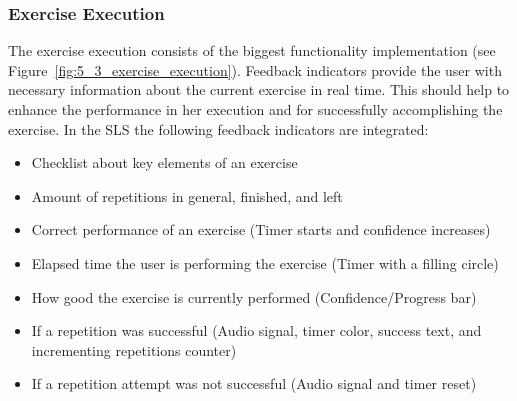 \subsubsection{Exercise Execution}
The exercise execution consists of the biggest functionality implementation (see Figure~\ref{fig:5_3_exercise_execution}). Feedback indicators provide the user with necessary information about the current exercise in real time. This should help to enhance the performance in her execution and for successfully accomplishing the exercise. In the SLS the following feedback indicators are integrated:

\begin{itemize}
\item Checklist about key elements of an exercise
\item Amount of repetitions in general, finished, and left
\item Correct performance of an exercise (Timer starts and confidence increases)
\item Elapsed time the user is performing the exercise (Timer with a filling circle)
\item How good the exercise is currently performed (Confidence/Progress bar)
\item If a repetition was successful (Audio signal, timer color, success text, and incrementing repetitions counter)
\item If a repetition attempt was not successful (Audio signal and timer reset)
\end{itemize}

